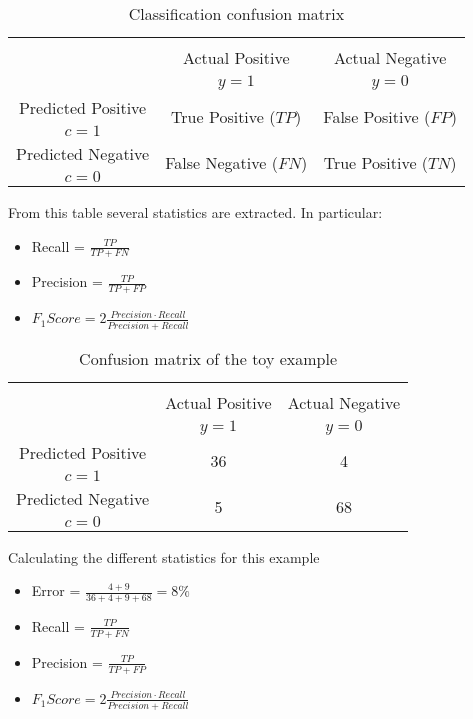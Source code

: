 	\begin{table}[!t]
		\centering
		\footnotesize
    \begin{tabular}{c|c|c}
      \multicolumn{3}{c}{}\\
			\multicolumn{1}{c|}{}  & Actual Positive& Actual Negative \\
			\multicolumn{1}{c|}{} & $y=1$& $y=0$ \\
			\hline
			Predicted Positive 		& \multirow{ 2}{*}{True Positive ($TP$)} & \multirow{ 
			2}{*}{False Positive ($FP$)} \\
			$c=1$ & &\\
			\hline
			Predicted Negative  	& \multirow{ 2}{*}{False Negative ($FN$)} & \multirow{ 
			2}{*}{True Positive ($TN$)} \\
			$c=0$ & &\\
		\end{tabular}
		\caption{Classification confusion matrix}
		\label{tab:ch2:1}
  \end{table}  

  	From this table several statistics are extracted. In particular:
	\begin{itemize}
		\item Recall = $\frac{TP}{TP+FN}$
		\item Precision = $\frac{TP}{TP+FP}$
		\item $F_1Score = 2\frac{Precision \cdot Recall}{Precision + Recall}$
	\end{itemize}


  
  	\begin{table}[!t]
		\centering
		\footnotesize
    \begin{tabular}{c|c|c}
      \multicolumn{3}{c}{}\\
			\multicolumn{1}{c|}{}  & Actual Positive& Actual Negative \\
			\multicolumn{1}{c|}{} & $y=1$& $y=0$ \\
			\hline
			Predicted Positive 		& \multirow{ 2}{*}{36} & \multirow{ 
			2}{*}{4} \\
			$c=1$ & &\\
			\hline
			Predicted Negative  	& \multirow{ 2}{*}{5} & \multirow{ 
			2}{*}{68} \\
			$c=0$ & &\\
		\end{tabular}
		\caption{Confusion matrix of the toy example}
		\label{tab:ch2:2}
  \end{table}  
  
  Calculating the different statistics for this example
  	\begin{itemize}
  	\item Error = $\frac{4+9}{36+4+9+68}=8\%$
		\item Recall = $\frac{TP}{TP+FN}$
		\item Precision = $\frac{TP}{TP+FP}$
		\item $F_1Score = 2\frac{Precision \cdot Recall}{Precision + Recall}$
	\end{itemize}
	
